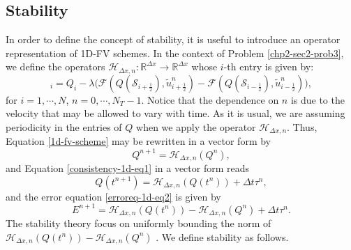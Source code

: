 \subsection{Stability}
\label{chp2-sub-stability}
In order to define the concept of stability, it is useful to introduce an operator
representation of 1D-FV schemes.
In the context of Problem \ref{chp2-sec2-prob3}, we define the operators
$\mathcal{H}_{\Delta x,n}: \mathbb{R}^{\Delta x} \to \mathbb{R}^{\Delta x}$ whose $i$-th entry is given by:
\begin{equation}
	[\mathcal{H}_{\Delta x,n}(Q)]_i = Q_i -
	\lambda \bigg( \mathcal{F}(Q(\mathcal{S}_{i+\frac{1}{2}} ),\tilde{u}^n_{i+\frac{1}{2}}) 
	- \mathcal{F}(Q(\mathcal{S}_{i-\frac{1}{2}} ),\tilde{u}^n_{i-\frac{1}{2}}) \bigg),
\end{equation}
for $i=1, \cdots, N$, $n=0, \cdots, N_T-1$.
Notice that the dependence on $n$ is due to the velocity that may be allowed
to vary with time.
As it is usual, we are assuming periodicity in the entries of $Q$ when 
we apply the operator $\mathcal{H}_{\Delta x,n}$.
Thus, Equation \eqref{1d-fv-scheme} may be rewritten in a vector form by
\begin{equation*}
	Q^{n+1} = \mathcal{H}_{\Delta x,n}(Q^n),
\end{equation*}
and Equation \eqref{consistency-1d-eq1} in a vector form reads
\begin{equation*}
	Q(t^{n+1}) = \mathcal{H}_{\Delta x,n}(Q(t^n)) + \Delta t \tau^n,
\end{equation*}
and the error equation \eqref{erroreq-1d-eq2} is given by
\begin{equation}
	\label{erroreq-1d-eq3}
	E^{n+1} = \mathcal{H}_{\Delta x,n}(Q(t^n)) - \mathcal{H}_{\Delta x,n}(Q^n) +  \Delta t \tau^n.
\end{equation}
The stability theory focus on uniformly bounding the norm of $\mathcal{H}_{\Delta x,n}(Q(t^n)) - \mathcal{H}_{\Delta x,n}(Q^n)$ \citep{leveque:2002}.
We define stability as follows.

